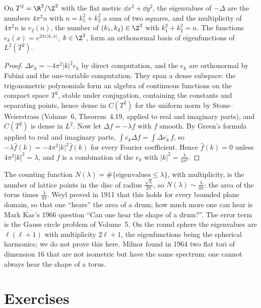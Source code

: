 \begin{theorem}\label{thm:torusspectrum}
On $T^2=\R^2/\Z^2$ with the flat metric $\dd x^2+\dd y^2$, the eigenvalues of $-\Delta$ are the numbers $4\pi^2n$ with $n=k_1^2+k_2^2$ a sum of two squares, and the multiplicity of
$4\pi^2n$ is $r_2(n)$, the number of $(k_1,k_2)\in\Z^2$ with $k_1^2+k_2^2=n$. The functions $e_k(x)=e^{2\pi i\langle k,x\rangle}$, $k\in\Z^2$, form an orthonormal basis of eigenfunctions of
$L^2(T^2)$.
\end{theorem}
\begin{proof}
$\Delta e_k=-4\pi^2|k|^2e_k$ by direct computation, and the $e_k$ are orthonormal by Fubini and the one-variable computation. They span a dense subspace: the
trigonometric polynomials form an algebra of continuous functions on the compact space $T^2$, stable under conjugation, containing the constants and separating
points, hence dense in $C(T^2)$ for the uniform norm by Stone--Weierstrass (Volume~6, Theorem~4.19, applied to real and imaginary parts), and $C(T^2)$ is dense in
$L^2$. Now let $\Delta f=-\lambda f$ with $f$ smooth. By Green's formula applied to real and imaginary parts, $\int\overline{e_k}\Delta f=\int\Delta\overline{e_k}\,f$, so
$-\lambda\hat f(k)=-4\pi^2|k|^2\hat f(k)$ for every Fourier coefficient. Hence $\hat f(k)=0$ unless $4\pi^2|k|^2=\lambda$, and $f$ is a combination of the $e_k$ with $|k|^2=\frac\lambda{4\pi^2}$.
\end{proof}

\begin{remark}
The counting function $N(\lambda)=\#\{\text{eigenvalues}\le\lambda\}$, with multiplicity, is the number of lattice points in the disc of radius $\frac{\sqrt\lambda}{2\pi}$, so
$N(\lambda)\sim\frac\lambda{4\pi}$: the area of the torus times $\frac\lambda{4\pi}$. Weyl proved in 1911 that this holds for every bounded plane domain, so that one ``hears'' the
area of a drum; how much more one can hear is Mark Kac's 1966 question ``Can one hear the shape of a drum?''. The error term is the Gauss circle problem of
Volume~5. On the round sphere the eigenvalues are $\ell(\ell+1)$ with multiplicity $2\ell+1$, the eigenfunctions being the spherical harmonics; we do not prove this here.
Milnor found in 1964 two flat tori of dimension $16$ that are not isometric but have the same spectrum: one cannot always hear the shape of a torus.
\end{remark}

\section{Exercises}

